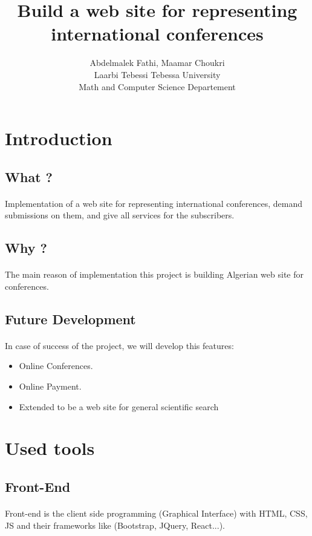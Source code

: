 \documentclass{article}
\title{Build a web site for representing international conferences}
\author{Abdelmalek Fathi, Maamar Choukri\\
Laarbi Tebessi Tebessa University\\
Math and Computer Science Departement}
\date{}
\begin{document}
	\maketitle
	\clearpage
	\tableofcontents
	\clearpage
	\section{Introduction}
	\subsection{What ?}
	\paragraph{}
	Implementation of a web site for representing international conferences, demand submissions on them, and give all services for the subscribers.
	\subsection{Why ?}
	\paragraph{}
	The main reason of implementation this project is building Algerian web site for conferences.
	\subsection{Future Development}
	\paragraph{}
	In case of success of the project, we will develop this features:
	\begin{itemize}
		\item Online Conferences.
		\item Online Payment.
		\item Extended to be a web site for general scientific search
	\end{itemize}
	\newpage
	\section{Used tools}
	\subsection{Front-End}
	\paragraph{}
	Front-end is the client side programming (Graphical Interface) with HTML, CSS, JS and their frameworks like (Bootstrap, JQuery, React...).
\end{document}
